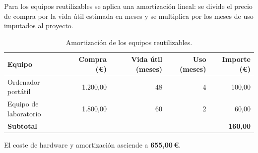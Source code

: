 \begin{samepage}
  \medskip
  Para los equipos reutilizables se aplica una amortización lineal: se
  divide el precio de compra por la vida útil estimada en meses y se
  multiplica por los meses de uso imputados al proyecto.

  \nopagebreak
  \begin{table}[H]
    \caption{Amortización de los equipos reutilizables.}
    \label{tab:presupuesto-amortizacion}
    \begin{tabularx}{\linewidth}{@{}>{\raggedright\arraybackslash}X r r r r@{}}
      \hline
      \textbf{Equipo}       & \textbf{Compra (€)} & \textbf{Vida útil (meses)} & \textbf{Uso (meses)} & \textbf{Importe (€)} \\
      \hline
      Ordenador portátil    &            1.200,00 &                         48 &                    4 &               100,00 \\
      Equipo de laboratorio &            1.800,00 &                         60 &                    2 &                60,00 \\
      \hline
      \textbf{Subtotal}     &                     &                            &                      &      \textbf{160,00} \\
      \hline
    \end{tabularx}
  \end{table}
  \medskip
  El coste de hardware y amortización asciende a \textbf{655,00\,€}.
\end{samepage}
\pagebreak[0]

